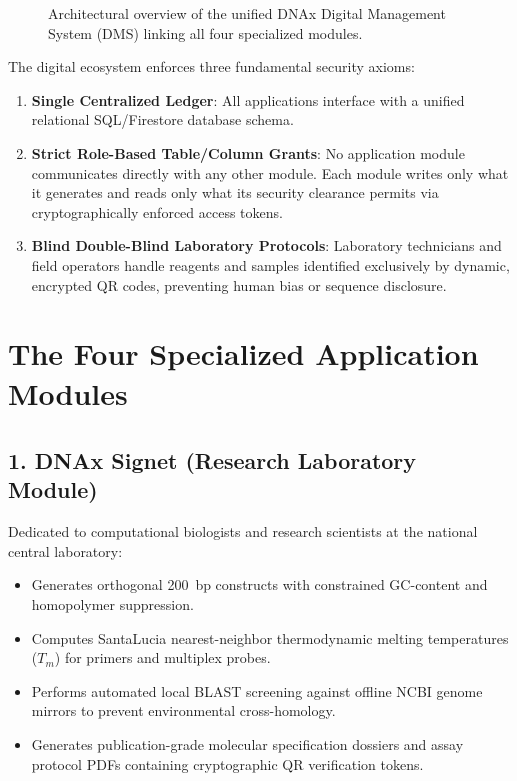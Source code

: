 \begin{figure}[H]
    \caption{Architectural overview of the unified DNAx Digital Management System (DMS) linking all four specialized modules.}
    \label{fig:dms_architecture}
\end{figure}

The digital ecosystem enforces three fundamental security axioms:
\begin{enumerate}
    \item \textbf{Single Centralized Ledger}: All applications interface with a unified relational SQL/Firestore database schema.
    \item \textbf{Strict Role-Based Table/Column Grants}: No application module communicates directly with any other module. Each module writes only what it generates and reads only what its security clearance permits via cryptographically enforced access tokens.
    \item \textbf{Blind Double-Blind Laboratory Protocols}: Laboratory technicians and field operators handle reagents and samples identified exclusively by dynamic, encrypted QR codes, preventing human bias or sequence disclosure.
\end{enumerate}

\section{The Four Specialized Application Modules}

\subsection{1. DNAx Signet\textsuperscript{\textcopyright} (Research Laboratory Module)}
Dedicated to computational biologists and research scientists at the national central laboratory:
\begin{itemize}
    \item Generates orthogonal 200~bp constructs with constrained GC-content and homopolymer suppression.
    \item Computes SantaLucia nearest-neighbor thermodynamic melting temperatures ($T_m$) for primers and multiplex probes.
    \item Performs automated local BLAST screening against offline NCBI genome mirrors to prevent environmental cross-homology.
    \item Generates publication-grade molecular specification dossiers and assay protocol PDFs containing cryptographic QR verification tokens.
\end{itemize}

